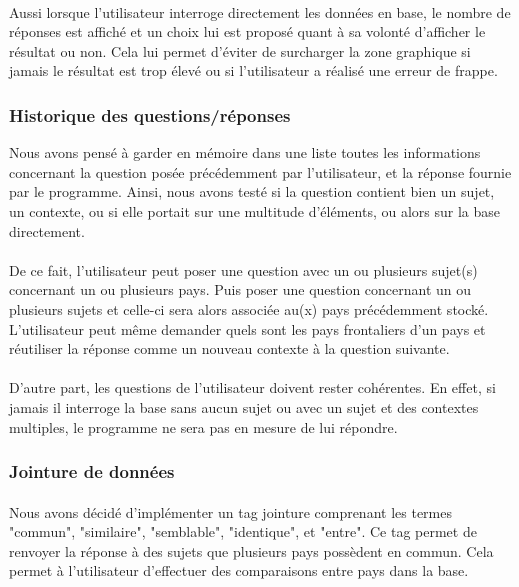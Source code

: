 \documentclass[11pt,a4paper]{article}
\begin{document}
\paragraph{}Aussi lorsque l'utilisateur interroge directement les données en base, le nombre de réponses est affiché et un choix lui est proposé quant à sa volonté d'afficher le résultat ou non. Cela lui permet d'éviter de surcharger la zone graphique si jamais le résultat est trop élevé ou si l'utilisateur a réalisé une erreur de frappe.

\subsubsection{Historique des questions/réponses}
Nous avons pensé à garder en mémoire dans une liste toutes les informations concernant la question posée précédemment par l'utilisateur, et la réponse fournie par le programme. Ainsi, nous avons testé si la question contient bien un sujet, un contexte, ou si elle portait sur une multitude d'éléments, ou alors sur la base directement. 
\paragraph{}De ce fait, l'utilisateur peut poser une question avec un ou plusieurs sujet(s) concernant un ou plusieurs pays. Puis poser une question concernant un ou plusieurs sujets et celle-ci sera alors associée au(x) pays précédemment stocké. L'utilisateur peut même demander quels sont les pays frontaliers d'un pays et réutiliser la réponse comme un nouveau contexte à la question suivante.
\paragraph{}D'autre part, les questions de l'utilisateur doivent rester cohérentes. En effet, si jamais il interroge la base sans aucun sujet ou avec un sujet et des contextes multiples, le programme ne sera pas en mesure de lui répondre.

\subsubsection{Jointure de données}
\paragraph{}Nous avons décidé d'implémenter un tag jointure comprenant les termes "commun", "similaire", "semblable", "identique", et "entre". Ce tag permet de renvoyer la réponse à des sujets que plusieurs pays possèdent en commun. Cela permet à l'utilisateur d'effectuer des comparaisons entre pays dans la base.
\end{document}
